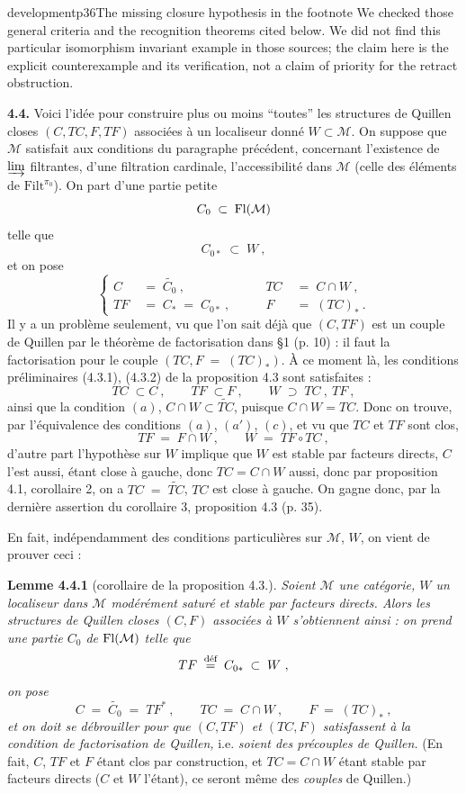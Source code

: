 \begin{dcomment}{development}{p36}{The missing closure hypothesis in the footnote}
We checked those general criteria and the recognition theorems cited below. We did not find this particular isomorphism invariant example in those sources; the claim here is the explicit counterexample and its verification, not a claim of priority for the retract obstruction.
\end{dcomment}


\textbf{4.4.} Voici l'idée pour construire plus ou moins “toutes” les structures de Quillen closes $(C,TC,F,TF)$ associées à un localiseur donné $W\subset\mathcal{M}$. On suppose que $\mathcal{M}$ satisfait aux conditions du paragraphe précédent, concernant l'existence de $\varinjlim$ filtrantes, d'une filtration cardinale, l'accessibilité dans $\mathcal{M}$ (celle des éléments de $\mathrm{Filt}^{\pi_0}$). On part d'une partie petite
\[
C_0\;\subset\;\mathrm{Fl}(\mathcal{M})
\]
telle que
\[
C_{0*}\;\subset\;W\ , \tag*{(4.4.1)}
\]
et on pose
\[
\left\{
\begin{aligned}
C &\;=\;\widetilde{C_0}\ , &\qquad TC &\;=\;C\cap W\ ,\\
TF &\;=\;C_*\;=\;C_{0*}\ , &\qquad F &\;=\;(TC)_*\ .
\end{aligned}
\right.
\tag*{(4.4.2)}
\]
Il y a un problème seulement, vu que l'on sait déjà que $(C,TF)$ est un couple de Quillen par le théorème de factorisation dans §1 (p. 10) : il faut la factorisation pour le couple $(TC,F\;=\;(TC)_*)$. À ce moment là, les conditions préliminaires (4.3.1), (4.3.2) de la proposition 4.3 sont satisfaites :
\[
TC\;\subset C\ ,\qquad TF\;\subset F\ ,\qquad W\;\supset\;TC\ ,\ TF\ ,
\]
ainsi que la condition $(a)$, $C\cap W\subset\widetilde{TC}$, puisque $C\cap W=TC$. Donc on trouve, par l'équivalence des conditions $(a)$, $(a')$, $(c)$, et vu que $TC$ et $TF$ sont clos,
\[
TF\;=\;F\cap W\ ,\qquad W\;=\;TF\circ TC\ ,
\]
d'autre part l'hypothèse sur $W$ implique que $W$ est stable par facteurs directs, $C$ l'est aussi, étant close à gauche, donc $TC=C{\cap}W$ aussi, donc par proposition 4.1, corollaire 2, on a $TC\;=\;\widetilde{TC}$, $TC$ est close à gauche. On gagne donc, par la dernière assertion du corollaire 3, proposition 4.3 (p. 35).

En fait, indépendamment des conditions particulières sur $\mathcal{M}$, $W$, on vient de prouver ceci :

\textbf{Lemme 4.4.1} (corollaire de la proposition 4.3.). \textit{Soient $\mathcal{M}$ une catégorie, $W$ un localiseur dans $\mathcal{M}$ modérément saturé et stable par facteurs directs. Alors les structures de Quillen closes $(C,F)$ associées à $W$ s'obtiennent ainsi : on prend une partie $C_0$ de} $\mathrm{Fl}(\mathcal{M})$ \textit{telle que}
\[
TF\;\deq\;C_{0*}\;\subset\;W\ ,
\]
\textit{on pose}
\[
C\;=\;\widetilde{C_0}\;=\;TF^*\ ,\qquad TC\;=\;C\cap W\ ,\qquad F\;=\;(TC)_*\ ,
\]
\textit{et on doit se débrouiller pour que $(C,TF)$ et $(TC,F)$ satisfassent à la condition de factorisation de Quillen,} i.e. \textit{soient des précouples de Quillen.} (En fait, $C$, $TF$ et $F$ étant clos par construction, et $TC=C\cap W$ étant stable par facteurs directs ($C$ et $W$ l'étant), ce seront même des \textit{couples} de Quillen.)

